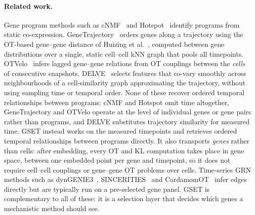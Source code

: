 \documentclass[10pt, letterpaper]{article}
\DeclareRobustCommand{\eliasadds}[1]{{\color{red}#1}}
\begin{document}
\paragraph{Related work.} Gene program methods such as cNMF~\cite{kotliar2019cnmf} and Hotspot~\cite{detomaso2021hotspot} identify programs from static co-expression. GeneTrajectory~\cite{qu2025genetrajectory} orders genes along a trajectory using the OT-based gene--gene distance of Huizing et al.~\cite{huizing2022ot}\eliasadds{, computed between gene distributions over a single, static cell--cell kNN graph that pools all timepoints}. OTVelo~\cite{zhao2025otvelo} infers lagged gene--gene relations from OT couplings between \eliasadds{the \emph{cells} of consecutive} snapshots. DELVE~\cite{ranek2024delve} selects features that co-vary smoothly across neighbourhoods of a cell-similarity graph approximating the trajectory, without using sampling time or temporal order. None of these recover ordered temporal relationships between programs: cNMF and Hotspot omit time altogether, GeneTrajectory and OTVelo operate at the level of individual genes or gene pairs rather than programs, and DELVE substitutes trajectory similarity for measured time. GSET instead works on the measured timepoints and retrieves ordered temporal relationships between programs directly. \eliasadds{It also transports \emph{genes} rather than cells: after embedding, every OT and KL computation takes place in gene space, between one embedded point per gene and timepoint, so it does not require cell--cell couplings or gene--gene OT problems over cells.} Time-series GRN methods such as dynGENIE3~\cite{huynhthu2018dyngenie3}, SINCERITIES~\cite{papiligao2018sincerities} and CardamomOT~\cite{ventre2026cardamomot} infer edges directly but are typically run on a pre-selected gene panel. GSET is complementary to all of these: it is a selection layer that decides which genes a mechanistic method should see.
\end{document}
